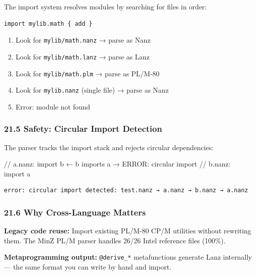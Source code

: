 \documentclass[
  11pt,
]{article}
\newenvironment{Shaded}{\begin{snugshade}}{\end{snugshade}}
\newcommand{\NormalTok}[1]{#1}
\providecommand{\tightlist}{%
  \setlength{\itemsep}{0pt}\setlength{\parskip}{0pt}}
\begin{document}
The import system resolves modules by searching for files in order:

\begin{verbatim}
import mylib.math { add }
\end{verbatim}

\begin{enumerate}
\def\labelenumi{\arabic{enumi}.}
\tightlist
\item
  Look for \texttt{mylib/math.nanz} → parse as Nanz
\item
  Look for \texttt{mylib/math.lanz} → parse as Lanz
\item
  Look for \texttt{mylib/math.plm} → parse as PL/M-80
\item
  Look for \texttt{mylib.nanz} (single file) → parse as Nanz
\item
  Error: module not found
\end{enumerate}

\hypertarget{safety-circular-import-detection}{%
\subsubsection{21.5 Safety: Circular Import
Detection}\label{safety-circular-import-detection}}

The parser tracks the import stack and rejects circular dependencies:

\begin{Shaded}
\begin{Highlighting}[]
\NormalTok{// a.nanz: import b      ← b imports a → ERROR: circular import}
\NormalTok{// b.nanz: import a}
\end{Highlighting}
\end{Shaded}

\begin{verbatim}
error: circular import detected: test.nanz → a.nanz → b.nanz → a.nanz
\end{verbatim}

\hypertarget{why-cross-language-matters}{%
\subsubsection{21.6 Why Cross-Language
Matters}\label{why-cross-language-matters}}

\textbf{Legacy code reuse:} Import existing PL/M-80 CP/M utilities
without rewriting them. The MinZ PL/M parser handles 26/26 Intel
reference files (100\%).

\textbf{Metaprogramming output:} \texttt{@derive\_*} metafunctions
generate Lanz internally --- the same format you can write by hand and
import.
\end{document}
